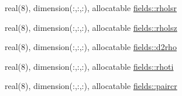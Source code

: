 \begin{DoxyCompactItemize}
\item 
real(8), dimension(\+:,\+:,\+:), allocatable \hyperlink{namespacefields_ad34c4612788bfa1f20ad97d5182c7614}{fields\+::rholsr}
\item 
real(8), dimension(\+:,\+:,\+:), allocatable \hyperlink{namespacefields_acd9b81a5e3e3061de1e548b3377edf43}{fields\+::rholsz}
\item 
real(8), dimension(\+:,\+:,\+:), allocatable \hyperlink{namespacefields_a5369b7cad87a8f7f4a8419064ff98f37}{fields\+::d2rho}
\item 
real(8), dimension(\+:,\+:,\+:), allocatable \hyperlink{namespacefields_abec1aee0d60d88cce3112a0be3262af7}{fields\+::rhoti}
\item 
real(8), dimension(\+:,\+:,\+:), allocatable \hyperlink{namespacefields_a7a53b33ec0000c8bbe276697057a6ba2}{fields\+::paircr}
\end{DoxyCompactItemize}
